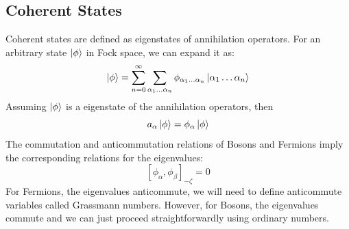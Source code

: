 \documentclass[12pt]{article}
\begin{document}
\subsection*{Coherent States}
Coherent states are defined as eigenstates of annihilation operators. For an arbitrary 
state $\ket{\phi}$ in Fock space, we can expand it as:
\begin{equation*}
    \ket{\phi}=\sum_{n=0}^{\infty}\sum_{\alpha_1\dots\alpha_n}
    \phi_{\alpha_1\dots\alpha_n}\ket{\alpha_1\dots\alpha_n}
\end{equation*}
Assuming $\ket{\phi}$ is a eigenstate of the annihilation operators, then
\begin{equation*}
    a_\alpha\ket{\phi}=\phi_\alpha\ket{\phi}
\end{equation*}
The commutation and anticommutation relations of Bosons and Fermions imply the 
corresponding relations for the eigenvalues:
\begin{equation*}
    \left[\phi_\alpha,\phi_\beta\right]_{-\zeta}=0
\end{equation*}
For Fermions, the eigenvalues anticommute, we will need to define anticommute 
variables called Grassmann numbers. However, for Bosons, the eigenvalues commute
and we can just proceed straightforwardly using ordinary numbers.
\end{document}
